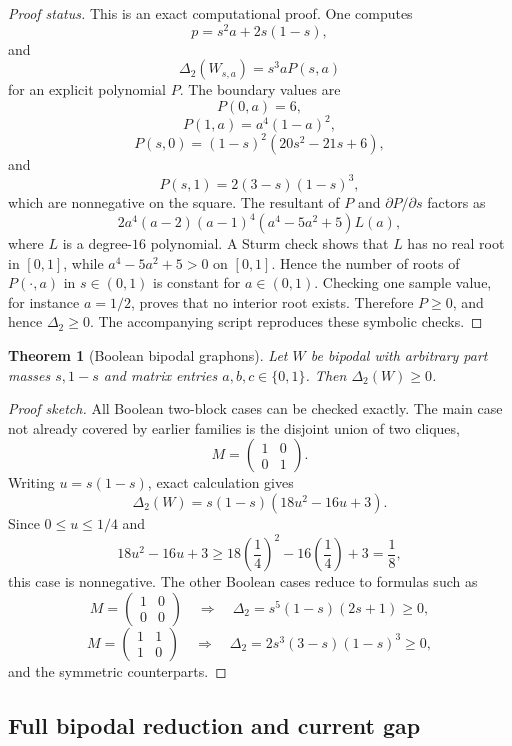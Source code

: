 \documentclass[11pt]{article}
\newtheorem{theorem}{Theorem}[section]
\theoremstyle{definition}
\begin{document}
\begin{proof}[Proof status]
This is an exact computational proof.  One computes
\[
  p=s^2a+2s(1-s),
\]
and
\[
  \Delta_2(W_{s,a})=s^3aP(s,a)
\]
for an explicit polynomial $P$.  The boundary values are
\[
  P(0,a)=6,
\]
\[
  P(1,a)=a^4(1-a)^2,
\]
\[
  P(s,0)=(1-s)^2(20s^2-21s+6),
\]
and
\[
  P(s,1)=2(3-s)(1-s)^3,
\]
which are nonnegative on the square.  The resultant of $P$ and $\partial P/\partial s$ factors as
\[
  2a^4(a-2)(a-1)^4(a^4-5a^2+5)L(a),
\]
where $L$ is a degree-$16$ polynomial.  A Sturm check shows that $L$ has no real root in $[0,1]$, while $a^4-5a^2+5>0$ on $[0,1]$.  Hence the number of roots of $P(\cdot,a)$ in $s\in(0,1)$ is constant for $a\in(0,1)$.  Checking one sample value, for instance $a=1/2$, proves that no interior root exists.  Therefore $P\ge0$, and hence $\Delta_2\ge0$.  The accompanying script reproduces these symbolic checks.
\end{proof}

\begin{theorem}[Boolean bipodal graphons]
Let $W$ be bipodal with arbitrary part masses $s,1-s$ and matrix entries $a,b,c\in\{0,1\}$.  Then $\Delta_2(W)\ge0$.
\end{theorem}

\begin{proof}[Proof sketch]
All Boolean two-block cases can be checked exactly.  The main case not already covered by earlier families is the disjoint union of two cliques,
\[
  M=\begin{pmatrix}1&0\\0&1\end{pmatrix}.
\]
Writing $u=s(1-s)$, exact calculation gives
\[
  \Delta_2(W)=s(1-s)(18u^2-16u+3).
\]
Since $0\le u\le1/4$ and
\[
  18u^2-16u+3\ge 18\left(\frac14\right)^2-16\left(\frac14\right)+3=\frac18,
\]
this case is nonnegative.  The other Boolean cases reduce to formulas such as
\[
  M=\begin{pmatrix}1&0\\0&0\end{pmatrix}
  \quad\Longrightarrow\quad
  \Delta_2=s^5(1-s)(2s+1)\ge0,
\]
\[
  M=\begin{pmatrix}1&1\\1&0\end{pmatrix}
  \quad\Longrightarrow\quad
  \Delta_2=2s^3(3-s)(1-s)^3\ge0,
\]
and the symmetric counterparts.
\end{proof}

\subsection{Full bipodal reduction and current gap}
\end{document}
